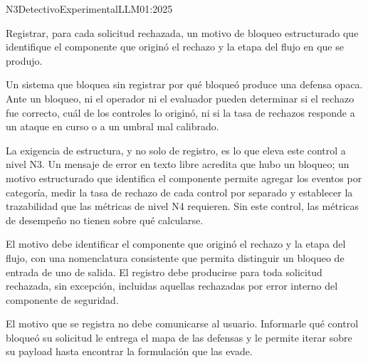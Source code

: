 
  {N3}{Detectivo}{Experimental}{LLM01:2025}

Registrar, para cada solicitud rechazada, un motivo de bloqueo estructurado que identifique el componente que originó el rechazo y la etapa del flujo en que se produjo.

Un sistema que bloquea sin registrar por qué bloqueó produce una defensa opaca. Ante un bloqueo, ni el operador ni el evaluador pueden determinar si el rechazo fue correcto, cuál de los controles lo originó, ni si la tasa de rechazos responde a un ataque en curso o a un umbral mal calibrado.

La exigencia de estructura, y no solo de registro, es lo que eleva este control a nivel N3. Un mensaje de error en texto libre acredita que hubo un bloqueo; un motivo estructurado que identifica el componente permite agregar los eventos por categoría, medir la tasa de rechazo de cada control por separado y establecer la trazabilidad que las métricas de nivel N4 requieren. Sin este control, las métricas de desempeño no tienen sobre qué calcularse.

El motivo debe identificar el componente que originó el rechazo y la etapa del flujo, con una nomenclatura consistente que permita distinguir un bloqueo de entrada de uno de salida. El registro debe producirse para toda solicitud rechazada, sin excepción, incluidas aquellas rechazadas por error interno del componente de seguridad.

El motivo que se registra no debe comunicarse al usuario. Informarle qué control bloqueó su solicitud le entrega el mapa de las defensas y le permite iterar sobre su payload hasta encontrar la formulación que las evade.


